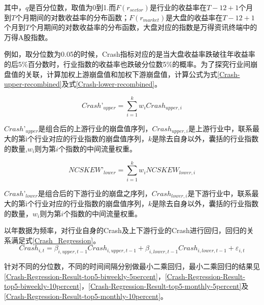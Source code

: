 \documentclass{sysuthesis}
\begin{document}
其中，$q$是百分位数，取值为0到1.而$F({r_{sector}})$是行业的收益率在$T-12+1$个月到$T$个月期间的对数收益率的分布函数；$F({r_{market}})$是大盘的收益率在$T-12+1$个月到$T$个月期间的对数收益率的分布函数，大盘对应的指数是万得资讯终端中的万得A股指数。

例如，取分位数为0.05的时候，Crash指标对应的是当大盘收益率跌破往年收益率的后5\%百分数时，行业指数的收益率也跌破分位数5\%的概率。为了探究行业间崩盘值的关联，计算加权上游崩盘值和加权下游崩盘值，计算公式为式\ref{Crash-upper-recombined}及式\ref{Crash-lower-recombined}。

\begin{equation}
\label{Crash-upper-recombined} 
{Crash’_{upper}} = \sum\limits_{i = 1}^k {{w_i}{Crash_{upper,i}}} 
\end{equation}

${Crash’_{upper}}$是组合后的上游行业的崩盘值序列，${Crash_{upper,i}}$是上游行业中，联系最大的第i个行业对应的行业指数的崩盘值序列，$k$是除去自身以外，囊括的行业指数的数量,${w_i}$则为第$i$个指数的中间流量权重。

\begin{equation}
\label{Crash-lower-recombined} 
{NCSKEW’_{lower}} = \sum\limits_{i = 1}^k {{w_i}{NCSKEW_{lower,i}}} 
\end{equation}

${Crash’_{lower}}$是组合后的下游行业的崩盘之序列，${Crash_{lower,i}}$是下游行业中，联系最大的第i个行业对应的行业指数的崩盘值序列，$k$是除去自身以外，囊括的行业指数的数量，${w_i}$则为第$i$个指数的中间流量权重。

以年数据为频率，对行业自身的Crash及上下游行业的Crash进行回归，回归的关系满足式\ref{Crash_Regression}。
\begin{equation}
\label{Crash_Regression}
{Crash_{i,t}} = {\beta _{i,upper,t - 1}}{Crash_{i,upper,t - 1}} + {\beta _{i,lower,t - 1}}{Crash_{i,lower,t - 1}} + {\varepsilon _{i,t}}
\end{equation}

针对不同的分位数，不同的时间间隔分别做最小二乘回归，最小二乘回归的结果见\ref{Crash-Regression-Result-top5-biweekly-5percent}，\ref{Crash-Regression-Result-top5-biweekly-10percent}，\ref{Crash-Regression-Result-top5-monthly-5percent}及\ref{Crash-Regression-Result-top5-monthly-10percent}。
\end{document}
